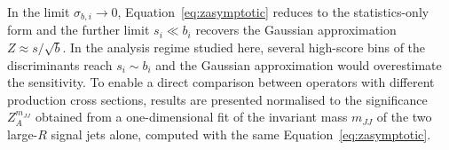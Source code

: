 In the limit $\sigma_{b,i}\to 0$, Equation~\eqref{eq:zasymptotic} reduces to the statistics-only form and the further limit $s_i\ll b_i$ recovers the Gaussian approximation $Z\approx s/\sqrt{b}$. In the analysis regime studied here, several high-score bins of the discriminants reach $s_i\sim b_i$ and the Gaussian approximation would overestimate the sensitivity. To enable a direct comparison between operators with different production cross sections, results are presented normalised to the significance $Z_A^{m_{JJ}}$ obtained from a one-dimensional fit of the invariant mass $m_{JJ}$ of the two large-$R$ signal jets alone, computed with the same Equation~\eqref{eq:zasymptotic}.
